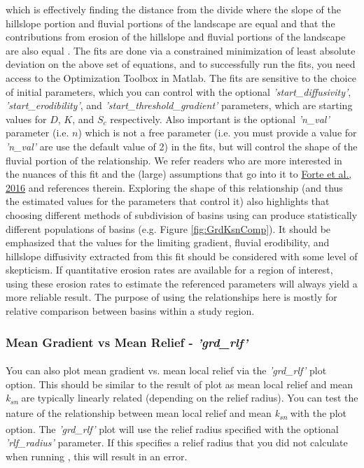 \noindent which is effectively finding the distance from the divide where the slope of the hillslope portion and fluvial portions of the landscape are equal and that the contributions from erosion of the hillslope and fluvial portions of the landscape are also equal \citep[e.g.,][]{Howard1997,Perron2008}. The fits are done via a constrained minimization of least absolute deviation on the above set of equations, and to successfully run the fits, you need access to the Optimization Toolbox in Matlab. The fits are sensitive to the choice of initial parameters, which you can control with the optional \textit{'start\_diffusivity'}, \textit{'start\_erodibility'}, and \textit{'start\_threshold\_gradient'} parameters, which are starting values for $D$, $K$, and $S_{c}$ respectively. Also important is the optional \textit{'n\_val'} parameter (i.e. $n$) which is not a free parameter  (i.e. you must provide a value for \textit{'n\_val'} are use the default value of 2) in the fits, but will control the shape of the fluvial portion of the relationship. We refer readers who are more interested in the nuances of this fit and the (large) assumptions that go into it to \href{https://www.sciencedirect.com/science/article/pii/S0012821X16303004}{Forte et al., 2016} and references therein. Exploring the shape of this relationship (and thus the estimated values for the parameters that control it) also highlights that choosing different methods of subdivision of basins using  can produce statistically different populations of basins (e.g. Figure \ref{fig:GrdKsnComp}). It should be emphasized that the values for the limiting gradient, fluvial erodibility, and hillslope diffusivity extracted from this fit should be considered with some level of skepticism. If quantitative erosion rates are available for a region of interest, using these erosion rates to estimate the referenced parameters will always yield a more reliable result. The purpose of using the relationships here is mostly for relative comparison between basins within a study region.

\subsubsection{Mean Gradient vs Mean Relief - \textit{'grd\_rlf'}} \label{sec:grdrlf}
\paragraph{}You can also plot mean gradient vs. mean local relief via the \textit{'grd\_rlf'} plot option. This should be similar to the result of  plot as mean local relief and mean \textit{k\textsubscript{sn}} are typically linearly related (depending on the relief radius). You can test the nature of the relationship between mean local relief and mean \textit{k\textsubscript{sn}} with the  plot option. The \textit{'grd\_rlf'} plot will use the relief radius specified with the optional \textit{'rlf\_radius'} parameter. If this specifies a relief radius that you did not calculate when running , this will result in an error.

